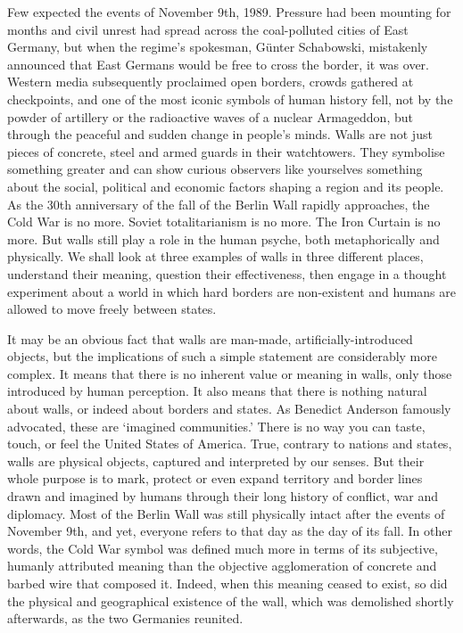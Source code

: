 \label{ch:tear-down-this-wall}

\renewcommand{\initial}[1]{%
     \lettrine[lines=3,lraise=0.18,lhang=0.45,findent=5pt,nindent=0em]{
     				\color{rooseveltblue}
     				{\textsf{#1}}}{}}

{\flushright{}}
\smallskip

\initial{F}ew expected the events of November 9th, 1989. Pressure had been
   mounting for months and civil unrest had spread across the
   coal-polluted cities of East Germany, but when the regime's spokesman,
   G{\"u}nter Schabowski, mistakenly announced that East Germans would be free
   to cross the border, it was over. Western media subsequently proclaimed
   open borders, crowds gathered at checkpoints, and one of the most
   iconic symbols of human history fell, not by the powder of artillery or
   the radioactive waves of a nuclear Armageddon, but through the peaceful
   and sudden change in people's minds. Walls are not just pieces of
   concrete, steel and armed guards in their watchtowers. They symbolise
   something greater and can show curious observers like yourselves
   something about the social, political and economic factors shaping a
   region and its people. As the 30th anniversary of the fall of the
   Berlin Wall rapidly approaches, the Cold War is no more. Soviet
   totalitarianism is no more. The Iron Curtain is no more. But walls
   still play a role in the human psyche, both metaphorically and
   physically. We shall look at three examples of walls in three different
   places, understand their meaning, question their effectiveness, then
   engage in a thought experiment about a world in which hard borders are
   non-existent and humans are allowed to move freely between states.

   It may be an obvious fact that walls are man-made,
   artificially-introduced objects, but the implications of such a simple
   statement are considerably more complex. It means that there is no
   inherent value or meaning in walls, only those introduced by human
   perception. It also means that there is nothing natural about walls, or
   indeed about borders and states. As Benedict Anderson famously
   advocated, these are `imagined communities.' There is no way you can
   taste, touch, or feel the United States of America. True, contrary to
   nations and states, walls are physical objects, captured and
   interpreted by our senses. But their whole purpose is to mark, protect
   or even expand territory and border lines drawn and imagined by humans
   through their long history of conflict, war and diplomacy. Most of the
   Berlin Wall was still physically intact after the events of November
   9th, and yet, everyone refers to that day as the day of its fall. In
   other words, the Cold War symbol was defined much more in terms of its
   subjective, humanly attributed meaning than the objective agglomeration
   of concrete and barbed wire that composed it. Indeed, when this meaning
   ceased to exist, so did the physical and geographical existence of the
   wall, which was demolished shortly afterwards, as the two Germanies
   reunited.


